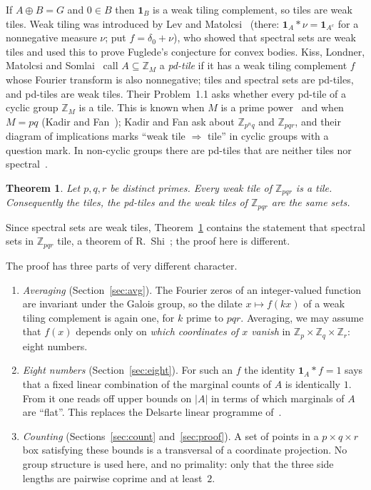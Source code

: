 \documentclass[11pt,a4paper]{amsart}
\newtheorem{theorem}{Theorem}
\theoremstyle{definition}
\theoremstyle{remark}
\newcommand{\Z}{\mathbb{Z}}
\newcommand{\one}{\mathbf{1}}
\begin{document}
If $A\oplus B=G$ and $0\in B$ then $\one_B$ is a weak tiling complement, so tiles are weak tiles. Weak tiling was
introduced by Lev and Matolcsi~\cite{LM} (there: $\one_A*\nu=\one_{A^c}$ for a nonnegative measure $\nu$; put
$f=\delta_0+\nu$), who showed that spectral sets are weak tiles and used this to prove Fuglede's conjecture for
convex bodies. Kiss, Londner, Matolcsi and Somlai~\cite{KLMS} call $A\subseteq\Z_M$ a \emph{pd-tile} if it has a
weak tiling complement $f$ whose Fourier transform is also nonnegative; tiles and spectral sets are pd-tiles,
and pd-tiles are weak tiles. Their Problem~1.1 asks whether every pd-tile of a cyclic group $\Z_M$ is a tile.
This is known when $M$ is a prime power~\cite{KLMS} and when $M=pq$ (Kadir and Fan~\cite{KF}); Kadir and Fan ask
about $\Z_{p^nq}$ and $\Z_{pqr}$, and their diagram of implications marks ``weak tile $\Rightarrow$ tile'' in
cyclic groups with a question mark. In non-cyclic groups there are pd-tiles that are neither tiles nor
spectral~\cite{KLMS2}.

\begin{theorem}\label{thm:main}
Let $p,q,r$ be distinct primes. Every weak tile of $\Z_{pqr}$ is a tile. Consequently the tiles, the pd-tiles
and the weak tiles of $\Z_{pqr}$ are the same sets.
\end{theorem}

Since spectral sets are weak tiles, Theorem~\ref{thm:main} contains the statement that spectral sets in
$\Z_{pqr}$ tile, a theorem of R.~Shi~\cite{Shi}; the proof here is different.

The proof has three parts of very different character.
\begin{enumerate}
\item \emph{Averaging} (Section~\ref{sec:avg}). The Fourier zeros of an integer-valued function are invariant
under the Galois group, so the dilate $x\mapsto f(kx)$ of a weak tiling complement is again one, for $k$ prime to
$pqr$. Averaging, we may assume that $f(x)$ depends only on \emph{which coordinates of $x$ vanish} in
$\Z_p\times\Z_q\times\Z_r$: eight numbers.
\item \emph{Eight numbers} (Section~\ref{sec:eight}). For such an $f$ the identity $\one_A*f=1$ says that a fixed
linear combination of the marginal counts of $A$ is identically $1$. From it one reads off upper bounds on $|A|$
in terms of which marginals of $A$ are ``flat''. This replaces the Delsarte linear programme of~\cite{KLMS,KF}.
\item \emph{Counting} (Sections~\ref{sec:count} and~\ref{sec:proof}). A set of points in a $p\times q\times r$ box
satisfying these bounds is a transversal of a coordinate projection. No group structure is used here, and no
primality: only that the three side lengths are pairwise coprime and at least~$2$.
\end{enumerate}
\end{document}

